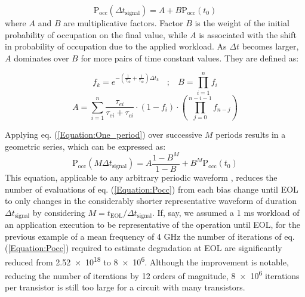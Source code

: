\begin{equation}
\label{Equation:One_period}
\text{P}_{\text{occ}}(\Delta t_{\text{signal}})=A +B \text{P}_{\text{occ}}(t_0)
\end{equation}
where $A$ and $B$ are multiplicative factors. Factor $B$ is the weight of the initial probability of occupation on the final value, while $A$ is associated with the shift in probability of occupation due to the applied workload. As $\Delta t$ becomes larger, $A$ dominates over $B$ for more pairs of time constant values. They are defined as:

\begin{equation*}
f_k = e^{-\left(\frac{1}{\tau_{e k}}+\frac{1}{\tau_{c k}}\right) \Delta t_k} \ \ \ \  ; \ \ \ \ B=\prod_{i=1}^n f_i 
\end{equation*}
\begin{equation*}
A=\sum_{i=1}^n \frac{\tau_{e i}}{\tau_{e i}+\tau_{c i}} \cdot \left(1-f_{i}\right) \cdot\left(\prod_{j=0}^{n-i-1} f_{n-j}\right)  
\end{equation*}

Applying eq. (\ref{Equation:One_period}) over successive $M$ periods results in a geometric series, which can be expressed as:
\begin{equation}
\label{Equation:Pocc_periodic}
\text{P}_{\text{occ}}(M \Delta t_\text{signal})=A \frac{1-B^M}{1-B}+B^M \text{P}_{\text{occ}}(t_0)
\end{equation}
 This equation, applicable to any arbitrary periodic waveform \cite{gieringNBTIModelingAnalog2014}, reduces the number of evaluations of eq. (\ref{Equation:Pocc}) from each bias change until EOL to only changes in the considerably shorter representative waveform of duration $\Delta t_\text{signal}$ by considering $M=t_\text{EOL} / \Delta t_{\text{signal}} $. If, say, we assumed a 1 ms workload of an application execution to be representative of the operation until EOL, for the previous example of a mean frequency of 4 GHz the number of iterations of eq. (\ref{Equation:Pocc}) required to estimate degradation at EOL are significantly reduced from \num{2.52e+18} to \num{8e6}. Although the improvement is notable, reducing the number of iterations by 12 orders of magnitude, \num{8e6} iterations per transistor is still too large for a circuit with many transistors.  


